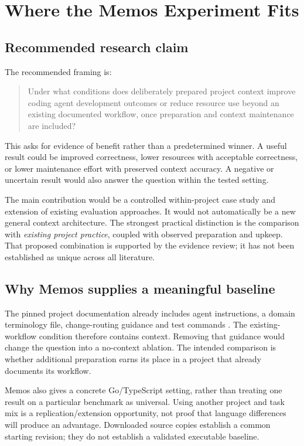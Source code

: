 \section{Where the Memos Experiment Fits}
\label{sec:position}

\subsection{Recommended research claim}
The recommended framing is:
\begin{quote}
Under what conditions does deliberately prepared project context improve coding
agent development outcomes or reduce resource use beyond an existing documented
workflow, once preparation and context maintenance are included?
\end{quote}
This asks for evidence of benefit rather than a predetermined winner. A useful
result could be improved correctness, lower resources with acceptable
correctness, or lower maintenance effort with preserved context accuracy.
A negative or uncertain result would also answer the question within the tested
setting.

The main contribution would be a controlled within-project case study and
extension of existing evaluation approaches. It would not automatically be a
new general context architecture. The strongest practical distinction is the
comparison with \emph{existing project practice}, coupled with observed
preparation and upkeep. That proposed combination is supported by the evidence
review; it has not been established as unique across all literature.

\subsection{Why Memos supplies a meaningful baseline}
The pinned project documentation already includes agent instructions, a domain
terminology file, change-routing guidance and test commands
\citep{memos2026}. The existing-workflow condition therefore contains context.
Removing that guidance would change the question into a no-context ablation.
The intended comparison is whether additional preparation earns its place in a
project that already documents its workflow.

Memos also gives a concrete Go/TypeScript setting, rather than treating one
result on a particular benchmark as universal. Using another project and task
mix is a replication/extension opportunity, not proof that language differences
will produce an advantage. Downloaded source copies establish a common starting
revision; they do not establish a validated executable baseline.

